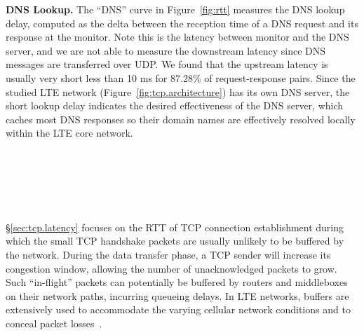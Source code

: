 \textbf{DNS Lookup.} The ``DNS'' curve in Figure~\ref{fig:rtt} measures the DNS lookup delay, computed as the delta between the reception time of a DNS request and its response at the monitor. Note this is the latency between monitor and the DNS server, and we are not able to measure the downstream latency since DNS messages are transferred over UDP. We found that the upstream latency is usually very short \ie less than 10 ms for 87.28\% of request-response pairs. Since the studied LTE network (Figure~\ref{fig:tcp.architecture}) has its own DNS server, the short lookup delay indicates the desired effectiveness of the DNS server, which caches most DNS responses so their domain names are effectively resolved locally within the LTE core network.

\begin{figure}[t]
\centering
{}\\
\label{fig:rtt.bif}
\end{figure}

\begin{figure}[t]
\centering
{}\\
\label{fig:rtt.bif.linux}
\end{figure}


\begin{figure}[h]
\centering
{}\\
\label{fig:bytes.in.flight}
\end{figure}


\label{sec:tcp.queue}

\S\ref{sec:tcp.latency} focuses on the RTT of TCP connection establishment during which the small TCP handshake packets are usually unlikely to be buffered by the network. During the data transfer phase, a TCP sender will increase its congestion window, allowing the number of unacknowledged packets to grow. Such ``in-flight'' packets can potentially be buffered by routers and middleboxes on their network paths, incurring queueing delays. In LTE networks, buffers are extensively used to accommodate the varying cellular network conditions and to conceal packet losses~\cite{4gbook}.

